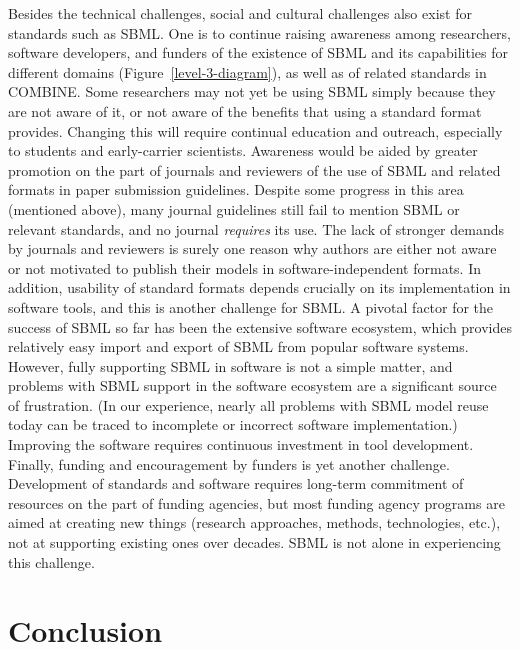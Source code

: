 \documentclass{sbml-paper}
\begin{document}
Besides the technical challenges, social and cultural challenges also exist for standards such as SBML.  One is to continue raising awareness among researchers, software developers, and funders of the existence of SBML and its capabilities for different domains (Figure~\ref{level-3-diagram}), as well as of related standards in COMBINE.  Some researchers may not yet be using SBML simply because they are not aware of it, or not aware of the benefits that using a standard format provides.  Changing this will require continual education and outreach, especially to students and early-carrier scientists.  Awareness would be aided by greater promotion on the part of journals and reviewers of the use of SBML and related formats in paper submission guidelines.  Despite some progress in this area (mentioned above), many journal guidelines still fail to mention SBML or relevant standards, and no journal \emph{requires} its use.  The lack of stronger demands by journals and reviewers is surely one reason why authors are either not aware or not motivated to publish their models in software-independent formats.  In addition, usability of standard formats depends crucially on its implementation in software tools, and this is another challenge for SBML.  A pivotal factor for the success of SBML so far has been the extensive software ecosystem, which provides relatively easy import and export of SBML from popular software systems.  However, fully supporting SBML in software is not a simple matter, and problems with SBML support in the software ecosystem are a significant source of frustration.  (In our experience, nearly all problems with SBML model reuse today can be traced to incomplete or incorrect software implementation.)  Improving the software requires continuous investment in tool development.  Finally, funding and encouragement by funders is yet another challenge.  Development of standards and software requires long-term commitment of resources on the part of funding agencies, but most funding agency programs are aimed at creating new things (research approaches, methods, technologies, etc.), not at supporting existing ones over decades.  SBML is not alone in experiencing this challenge.


\section*{Conclusion}
\end{document}
